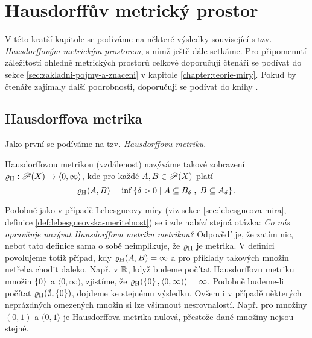 \chapter{Hausdorffův metrický prostor}\label{chapter:hausdorffuv-mp}

V této kratší kapitole se podíváme na některé výsledky související s tzv. \emph{Hausdorffovým metrickým prostorem}, s nímž ještě dále setkáme. Pro připomenutí záležitostí ohledně metrických prostorů celkově doporučuji čtenáři se podívat do sekce \ref{sec:zakladni-pojmy-a-znaceni} v kapitole \ref{chapter:teorie-miry}. Pokud by čtenáře zajímaly další podrobnosti, doporučuji se podívat do knihy \citep[str. 71]{Edgar2008}.

\section{Hausdorffova metrika}\label{sec:hausdorffova-metrika}

Jako první se podíváme na tzv. \emph{Hausdorffovu metriku}.
\begin{definition}\label{def:hausdorffova-metrika}
    Hausdorffovou metrikou (vzdálenost) nazýváme takové zobrazení $\varrho_\textup{H}:\mathscr{P}(X) \rightarrow \langle0,\infty\rangle$, kde pro každé $A,B\in\mathscr{P}(X)$ platí
    \[\varrho_\textup{H}(A,B)=\inf\left\{\delta>0\;\middle|\;A\subseteq B_\delta\;,\;B\subseteq A_\delta\right\}.\]
\end{definition}
Podobně jako v případě Lebesgueovy míry (viz sekce \ref{sec:lebesgueova-mira}, definice \ref{def:lebesgueovska-meritelnost}) se i zde nabízí stejná otázka: \emph{Co nás opravňuje nazývat Hausdorffovu metriku metrikou?} Odpovědí je, že zatím nic, neboť tato definice sama o sobě neimplikuje, že $\varrho_\textup{H}$ je metrika. V definici povolujeme totiž případ, kdy $\varrho_\textup{H}(A,B)=\infty$ a pro příklady takových množin netřeba chodit daleko. Např. v $\mathbb{R}$, když budeme počítat Hausdorffovu metriku množin $\left\{0\right\}$ a $\langle 0,\infty)$, zjistíme, že $\varrho_\textup{H}(\left\{0\right\},\langle 0,\infty))=\infty$. Podobně budeme-li počítat $\varrho_\textup{H}(\emptyset,\left\{0\right\})$, dojdeme ke stejnému výsledku. Ovšem i v případě některých neprázdných omezených množin si lze všimnout nesrovnalostí. Např. pro množiny $(0,1)$ a $(0,1\rangle$ je Hausdorffova metrika nulová, přestože dané množiny nejsou stejné.

